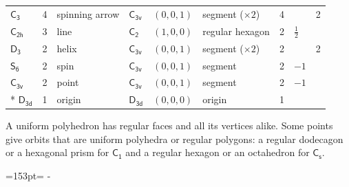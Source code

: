 \documentclass[10pt,a4paper]{article}
\newcommand{\needspace}[1]{\par\penalty-100\begingroup\dimen0=#1\relax\dimen2=\pagegoal
  \advance\dimen2-\pagetotal\ifdim\dimen0>\dimen2\relax\ifdim\dimen2>0pt\vfil\break\fi\fi
  \endgroup}
\numberwithin{equation}{section}
\newcommand{\grp}[1]{\mathsf{#1}}
\newlength{\fillwidth}\newlength{\cellwidth}\newlength{\colwidth}
\begin{document}
{{\begin{longtable}{@{}lrllllr>{\RaggedRight\arraybackslash}p{\fillwidth}r@{}}
\href{C3.pdf}{$\grp{C_{3}}$} & 4 & spinning arrow & \href{C3v.pdf}{$\grp{C_{3v}}$} & $(0, 0, 1)$ & segment (${\times}2$) & 4 &  & 2\\
\href{C2h.pdf}{$\grp{C_{2h}}$} & 3 & line & \href{C2.pdf}{$\grp{C_{2}}$} & $(1, 0, 0)$ & regular hexagon & 2 & ${\tfrac{1}{2}}$ & \\
\href{D3.pdf}{$\grp{D_{3}}$} & 2 & helix & \href{C3v.pdf}{$\grp{C_{3v}}$} & $(0, 0, 1)$ & segment (${\times}2$) & 2 &  & 2\\
\href{S6.pdf}{$\grp{S_{6}}$} & 2 & spin & \href{C3v.pdf}{$\grp{C_{3v}}$} & $(0, 0, 1)$ & segment & 2 & ${-1}$ & \\
\href{C3v.pdf}{$\grp{C_{3v}}$} & 2 & point & \href{C3v.pdf}{$\grp{C_{3v}}$} & $(0, 0, 1)$ & segment & 2 & ${-1}$ & \\*
\href{D3d.pdf}{$\grp{D_{3d}}$} & 1 & origin & \href{D3d.pdf}{$\grp{D_{3d}}$} & $(0, 0, 0)$ & origin & 1 &  & \\
\bottomrule\end{longtable}}}
A uniform polyhedron has regular faces and all its vertices alike. Some points give orbits that are uniform polyhedra or regular polygons: a regular dodecagon or a hexagonal prism for \href{C1.pdf}{$\grp{C_{1}}$} and a regular hexagon or an octahedron for \href{C1v.pdf}{$\grp{C_{s}}$}.
\needspace{153pt}
\end{document}
